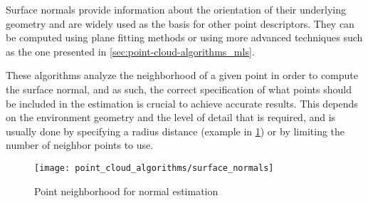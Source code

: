Surface normals provide information about the orientation of their underlying geometry and are widely used as the basis for other point descriptors. They can be computed using plane fitting methods or using more advanced techniques such as the one presented in \cref{sec:point-cloud-algorithms_mls}.

These algorithms analyze the neighborhood of a given point in order to compute the surface normal, and as such, the correct specification of what points should be included in the estimation is crucial to achieve accurate results. This depends on the environment geometry and the level of detail that is required, and is usually done by specifying a radius distance (example in \cref{fig:point-cloud-algorithms_surface-normals}) or by limiting the number of neighbor points to use.

\begin{figure}[H]
	\centering
	\texttt{[image: point\_cloud\_algorithms/surface\_normals]}
	\caption{Point neighborhood for normal estimation \cite{Rusu2010a}}
	\label{fig:point-cloud-algorithms_surface-normals}
\end{figure}

